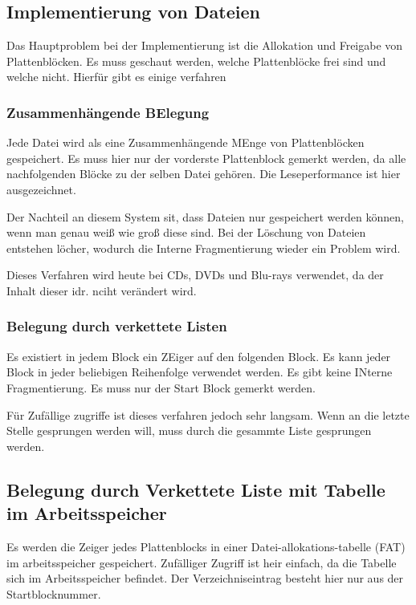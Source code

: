 \subsection{Implementierung von Dateien}

Das Hauptproblem bei der Implementierung ist die Allokation und Freigabe von
Plattenblöcken. Es muss geschaut werden, welche Plattenblöcke frei sind und
welche nicht. Hierfür gibt es einige verfahren

\subsubsection{Zusammenhängende BElegung}

Jede Datei wird als eine Zusammenhängende MEnge von Plattenblöcken gespeichert.
Es muss hier nur der vorderste Plattenblock gemerkt werden, da alle
nachfolgenden Blöcke zu der selben Datei gehören. Die Leseperformance ist hier
ausgezeichnet.

Der Nachteil an diesem System sit, dass Dateien nur gespeichert werden können,
wenn man genau weiß wie groß diese sind. Bei der Löschung von Dateien entstehen
löcher, wodurch die Interne Fragmentierung wieder ein Problem wird.

Dieses Verfahren wird heute bei CDs, DVDs und Blu-rays verwendet, da der Inhalt
dieser idr. nciht verändert wird.

\subsubsection{Belegung durch verkettete Listen}

Es existiert in jedem Block ein ZEiger auf den folgenden Block. Es kann jeder
Block in jeder beliebigen Reihenfolge verwendet werden. Es gibt keine INterne
Fragmentierung. Es muss nur der Start Block gemerkt werden.

Für Zufällige zugriffe ist dieses verfahren jedoch sehr langsam. Wenn an die
letzte Stelle gesprungen werden will, muss durch die gesammte Liste gesprungen
werden.

\subsection{Belegung durch Verkettete Liste mit Tabelle im Arbeitsspeicher}

Es werden die Zeiger jedes Plattenblocks in einer Datei-allokations-tabelle
(FAT) im arbeitsspeicher gespeichert. Zufälliger Zugriff ist heir einfach, da
die Tabelle sich im Arbeitsspeicher befindet. Der Verzeichniseintrag besteht
hier nur aus der Startblocknummer.

